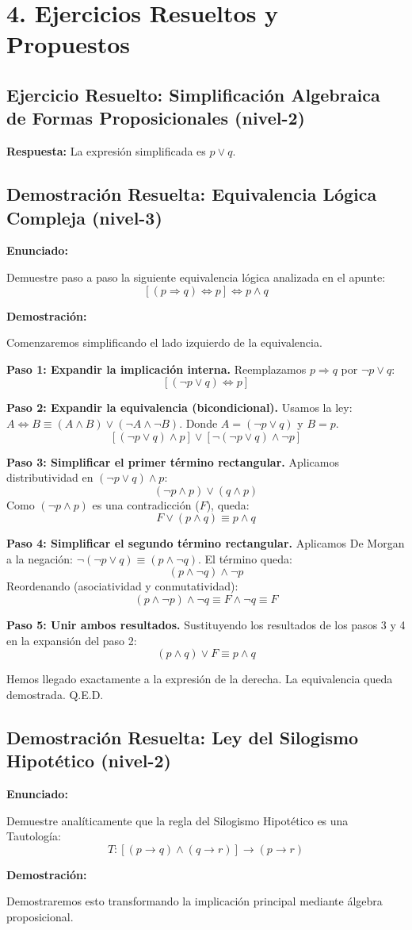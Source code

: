\documentclass[11pt]{article}
\newenvironment{ejercicios}{\section*{4. Ejercicios Resueltos y Propuestos}}{}
\newenvironment{ejercicioresuelto}[2]{\subsection*{Ejercicio Resuelto: #1 \hfill \normalfont\small(#2)}}{}
\newcommand{\enunciado}[1]{\textbf{Enunciado:}\par#1\par\medskip}
\newenvironment{ejerciciodemostracion}[2]{\subsection*{Demostración Resuelta: #1 \hfill \normalfont\small(#2)}}{}
\newcommand{\demostracion}[1]{\textbf{Demostración:}\par#1\par\bigskip}
\begin{document}
\begin{ejercicios}
\begin{ejercicioresuelto}{Simplificación Algebraica de Formas Proposicionales}{nivel-2}
{      \textbf{Respuesta:} La expresión simplificada es $p \vee q$.
    }
  \end{ejercicioresuelto}

  \begin{ejerciciodemostracion}{Equivalencia Lógica Compleja}{nivel-3}
    \enunciado{
      Demuestre paso a paso la siguiente equivalencia lógica analizada en el apunte:
      $$ [(p \Rightarrow q) \Leftrightarrow p] \Leftrightarrow p \wedge q $$
    }
    \demostracion{
      Comenzaremos simplificando el lado izquierdo de la equivalencia.
      
      \textbf{Paso 1: Expandir la implicación interna.}
      Reemplazamos $p \Rightarrow q$ por $\neg p \vee q$:
      $$ [(\neg p \vee q) \Leftrightarrow p] $$
      
      \textbf{Paso 2: Expandir la equivalencia (bicondicional).}
      Usamos la ley: $A \Leftrightarrow B \equiv (A \wedge B) \vee (\neg A \wedge \neg B)$.
      Donde $A = (\neg p \vee q)$ y $B = p$.
      $$ [(\neg p \vee q) \wedge p] \vee [\neg(\neg p \vee q) \wedge \neg p] $$
      
      \textbf{Paso 3: Simplificar el primer término rectangular.}
      Aplicamos distributividad en $(\neg p \vee q) \wedge p$:
      $$ (\neg p \wedge p) \vee (q \wedge p) $$
      Como $(\neg p \wedge p)$ es una contradicción ($F$), queda:
      $$ F \vee (p \wedge q) \equiv p \wedge q $$
      
      \textbf{Paso 4: Simplificar el segundo término rectangular.}
      Aplicamos De Morgan a la negación: $\neg(\neg p \vee q) \equiv (p \wedge \neg q)$.
      El término queda:
      $$ (p \wedge \neg q) \wedge \neg p $$
      Reordenando (asociatividad y conmutatividad):
      $$ (p \wedge \neg p) \wedge \neg q \equiv F \wedge \neg q \equiv F $$
      
      \textbf{Paso 5: Unir ambos resultados.}
      Sustituyendo los resultados de los pasos 3 y 4 en la expansión del paso 2:
      $$ (p \wedge q) \vee F \equiv p \wedge q $$
      
      Hemos llegado exactamente a la expresión de la derecha. La equivalencia queda demostrada. Q.E.D.
    }
  \end{ejerciciodemostracion}

  \begin{ejerciciodemostracion}{Ley del Silogismo Hipotético}{nivel-2}
    \enunciado{
      Demuestre analíticamente que la regla del Silogismo Hipotético es una Tautología:
      $$ T: [(p \rightarrow q) \wedge (q \rightarrow r)] \rightarrow (p \rightarrow r) $$
    }
    \demostracion{
      Demostraremos esto transformando la implicación principal mediante álgebra proposicional.
      
}
\end{ejerciciodemostracion}
\end{ejercicios}
\end{document}
